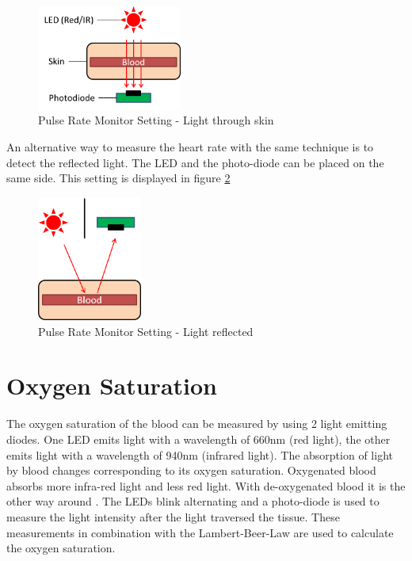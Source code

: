 \documentclass[notitlepage]{scrreprt}
\begin{document}
\begin{figure}[H]
	\centering
	\includegraphics[width=180px]{images/pulse-rate-aufbau.png}
	\caption{Pulse Rate Monitor Setting - Light through skin}
	\label{fig:pulse-rate-monitor-setting}
\end{figure}

\newpage

An alternative way to measure the heart rate with the same technique is to detect the reflected light. The LED and the photo-diode can be placed on the same side. This setting is displayed in figure \ref{fig:pulse-rate-monitor-setting2}

\begin{figure}[H]
	\centering
	\includegraphics[width=130px]{images/pulse-rate-aufbau2.png}
	\caption{Pulse Rate Monitor Setting - Light reflected}
	\label{fig:pulse-rate-monitor-setting2}
\end{figure}

\section{Oxygen Saturation}
The oxygen saturation of the blood can be measured by using 2 light emitting diodes. One LED emits light with a wavelength of 660nm (red light), the other emits light with a wavelength of 940nm (infrared light). The absorption of light by blood changes corresponding to its oxygen saturation. Oxygenated blood absorbs more infra-red light and less red light. With de-oxygenated blood it is the other way around \cite{bib:pulse-oximetry}. The LEDs blink alternating and a photo-diode is used to measure the light intensity after the light traversed the tissue. These measurements in combination with the Lambert-Beer-Law are used to calculate the oxygen saturation.
\end{document}
